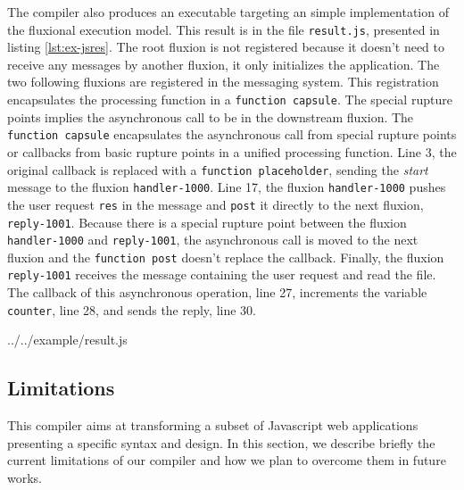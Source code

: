 The compiler also produces an executable targeting an simple implementation of the fluxional execution model.
This result is in the file \texttt{result.js}, presented in listing \ref{lst:ex-jsres}.
The root fluxion is not registered because it doesn't need to receive any messages by another fluxion, it only initializes the application.
The two following fluxions are registered in the messaging system.
This registration encapsulates the processing function in a \texttt{function capsule}.
The special rupture points implies the asynchronous call to be in the downstream fluxion.
The \texttt{function capsule} encapsulates the asynchronous call from special rupture points or callbacks from basic rupture points in a unified processing function.
Line 3, the original callback is replaced with a \texttt{function placeholder}, sending the \textit{start} message to the fluxion \texttt{handler-1000}.
Line 17, the fluxion \texttt{handler-1000} pushes the user request \texttt{res} in the message and \texttt{post} it directly to the next fluxion, \texttt{reply-1001}.
Because there is a special rupture point between the fluxion \texttt{handler-1000} and \texttt{reply-1001}, the asynchronous call is moved to the next fluxion and the \texttt{function post} doesn't replace the callback.
Finally, the fluxion \texttt{reply-1001} receives the message containing the user request and read the file.
The callback of this asynchronous operation, line 27, increments the variable \texttt{counter}, line 28, and sends the reply, line 30.

{../../example/result.js}

\subsection{Limitations}

This compiler aims at transforming a subset of Javascript web applications presenting a specific syntax and design.
In this section, we describe briefly the current limitations of our compiler and how we plan to overcome them in future works.

